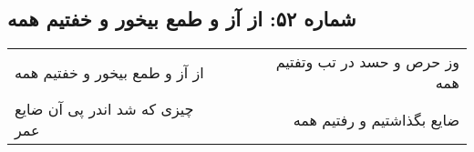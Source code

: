\begin{center}
\section*{شماره ۵۲: از آز و طمع بیخور و خفتیم همه}
\label{sec:052}
\begin{longtable}{l p{0.5cm} r}
از آز و طمع بیخور و خفتیم همه
&&
وز حرص و حسد در تب وتفتیم همه
\\
چیزی که شد اندر پی آن ضایع عمر
&&
ضایع بگذاشتیم و رفتیم همه
\\
\end{longtable}
\end{center}
